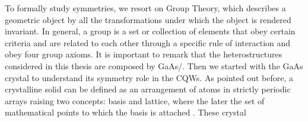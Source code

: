 To formally study symmetries, we resort on Group Theory, which describes a geometric object by all the transformations 
under which the object is rendered invariant. In general, a group is a set or collection of elements that obey certain criteria and are related to each other through a specific rule of interaction and obey four group axioms\cite{powell2010symmetry,cornwell1997group,muller2013symmetry,cho1976unified}. 
It is important to remark that the heterostructures considered in this thesis are composed by GaAs/\algaas. Then  we started with the GaAs crystal to understand its symmetry role in the \gls{CQWs}. 
As pointed out before, a crystalline solid can  be defined as an arrangement of atoms in strictly periodic arrays \cite{kittel2018kittel,solyom2007fundamentals} raising two concepts: basis and lattice, where the later
the set of mathematical points to which the basis is attached \cite{kittel2018kittel}. These crystal
